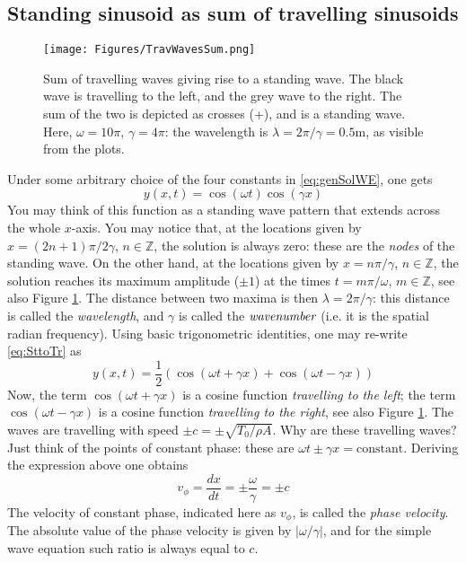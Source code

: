 \documentclass[11pt,twoside,a4paper,english]{book}
\begin{document}
\subsection{Standing sinusoid as sum of travelling sinusoids}
\begin{figure}[hbt]
\texttt{[image: Figures/TravWavesSum.png]}
\caption{Sum of travelling waves giving rise to a standing wave. The black wave is travelling to the left, and the grey wave to the right. The sum of the two is depicted as crosses (+), and is a standing wave. Here, $\omega = 10\pi$, $\gamma = 4\pi$: the wavelength is $\lambda = 2\pi/\gamma = 0.5$m, as visible from the plots.}\label{fig:travStd}
\end{figure}
Under some arbitrary choice of the four constants in \eqref{eq:genSolWE}, one gets
\begin{equation}\label{eq:SttoTr}
y(x,t) = \cos (\omega t )\cos (\gamma x )
\end{equation}
You may think of this function as a standing wave pattern that extends across the whole $x$-axis. You may notice that, at the locations given by $x = (2n+1)\pi /2 \gamma$, $n\in\mathbb Z$, the solution is always zero: these are the \emph{nodes} of the standing wave. On the other hand, at the locations given by $x = n\pi/\gamma$, $n\in\mathbb Z$, the solution reaches its maximum amplitude ($\pm 1$) at the times $t = m\pi/\omega$, $m\in\mathbb Z$, see also Figure \ref{fig:travStd}. The distance between two maxima is then $\lambda = 2\pi / \gamma$: this distance is called the \emph{wavelength}, and $\gamma$ is called the $\emph{wavenumber}$ (i.e. it is the spatial radian frequency). Using basic trigonometric identities, one may re-write \eqref{eq:SttoTr} as
\begin{equation}\label{eq:SumTrav}
y(x,t) = \frac{1}{2}\left(\cos (\omega t + \gamma x) + \cos (\omega t - \gamma x ) \right)
\end{equation}
Now, the term $\cos (\omega t + \gamma x)$ is a cosine function \emph{travelling to the left}; the term $\cos (\omega t - \gamma x )$ is a cosine function \emph{travelling to the right}, see also Figure \ref{fig:travStd}. The waves are travelling with speed $\pm c=\pm\sqrt{T_0/ \rho A}$. Why are these travelling waves? Just think of the points of constant phase: these are $\omega t \pm \gamma x = \text{constant}$.
Deriving the expression above one obtains
\begin{equation}
v_\phi = \frac{dx}{dt} = \pm \frac{\omega}{\gamma} = \pm c
\end{equation}
The velocity of constant phase, indicated here as $v_\phi$, is called the \emph{phase velocity}. The absolute value of the phase velocity is given by $|\omega/\gamma|$, and for the simple wave equation such ratio is always equal to $c$.
\end{document}
